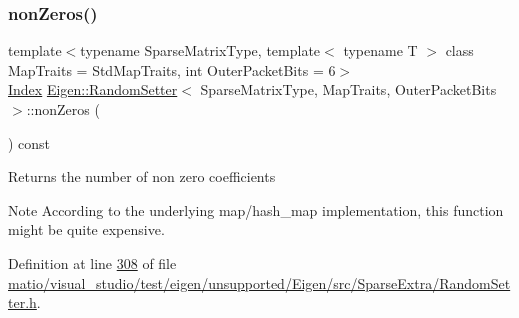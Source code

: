 \mbox{\label{class_eigen_1_1_random_setter_ac34e5cd67e370641c3b48c8a91705046}} 
\subsubsection{\texorpdfstring{non\+Zeros()}{nonZeros()}\hspace{0.1cm}{\footnotesize\ttfamily [2/2]}}
{\footnotesize\ttfamily template$<$typename Sparse\+Matrix\+Type, template$<$ typename T $>$ class Map\+Traits = Std\+Map\+Traits, int Outer\+Packet\+Bits = 6$>$ \\
\hyperlink{namespace_eigen_a62e77e0933482dafde8fe197d9a2cfde}{Index} \hyperlink{class_eigen_1_1_random_setter}{Eigen\+::\+Random\+Setter}$<$ Sparse\+Matrix\+Type, Map\+Traits, Outer\+Packet\+Bits $>$\+::non\+Zeros (\begin{DoxyParamCaption}{ }\end{DoxyParamCaption}) const\hspace{0.3cm}{\ttfamily [inline]}}

\begin{DoxyReturn}{Returns}
the number of non zero coefficients
\end{DoxyReturn}
\begin{DoxyNote}{Note}
According to the underlying map/hash\+\_\+map implementation, this function might be quite expensive. 
\end{DoxyNote}


Definition at line \hyperlink{matio_2visual__studio_2test_2eigen_2unsupported_2_eigen_2src_2_sparse_extra_2_random_setter_8h_source_l00308}{308} of file \hyperlink{matio_2visual__studio_2test_2eigen_2unsupported_2_eigen_2src_2_sparse_extra_2_random_setter_8h_source}{matio/visual\+\_\+studio/test/eigen/unsupported/\+Eigen/src/\+Sparse\+Extra/\+Random\+Setter.\+h}.

\mbox{\label{class_eigen_1_1_random_setter_a77dcbbc964b42027e00af269a5147c68}} 

